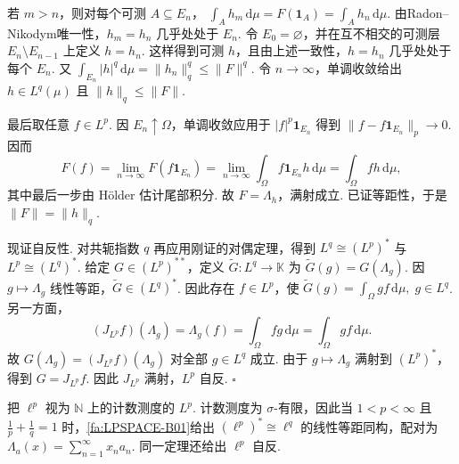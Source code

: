 \begin{FAProof}
若 \(\displaystyle m>n\)，则对每个可测 \(\displaystyle A\subseteq E_n\)， \(\displaystyle \int_Ah_m\,\mathrm{d}\mu =F(\mathbf1_A) =\int_Ah_n\,\mathrm{d}\mu\).
由Radon--Nikodym唯一性，\(\displaystyle h_m=h_n\) 几乎处处于 \(\displaystyle E_n\). 令 \(\displaystyle E_0=\varnothing\)，并在互不相交的可测层 \(\displaystyle E_n\setminus E_{n-1}\) 上定义 \(\displaystyle h=h_n\). 这样得到可测 \(\displaystyle h\)，且由上述一致性，\(\displaystyle h=h_n\) 几乎处处于每个 \(\displaystyle E_n\). 又 \(\displaystyle \int_{E_n}|h|^q\,\mathrm{d}\mu =\|h_n\|_q^q \leqslant\|F\|^q\).
令 \(\displaystyle n\to\infty\)，单调收敛给出 \(\displaystyle h\in L^q(\mu)\) 且 \(\displaystyle \|h\|_q\leqslant\|F\|\).

最后取任意 \(\displaystyle f\in L^p\). 因 \(\displaystyle E_n\uparrow\Omega\)，单调收敛应用于 \(\displaystyle |f|^p\mathbf1_{E_n}\) 得到 \(\displaystyle \|f-f\mathbf1_{E_n}\|_p\to0\). 因而
\[
F(f)
=\lim_{n\to\infty}F(f\mathbf1_{E_n})
=\lim_{n\to\infty}\int_\Omega f\mathbf1_{E_n}h\,\mathrm{d}\mu
=\int_\Omega fh\,\mathrm{d}\mu,
\]
其中最后一步由 Hölder 估计尾部积分. 故 \(\displaystyle F=\Lambda_h\)，满射成立. 已证等距性，于是 \(\displaystyle \|F\|=\|h\|_q\).

现证自反性. 对共轭指数 \(\displaystyle q\) 再应用刚证的对偶定理，得到 \(\displaystyle L^q\cong(L^p)^*\) 与 \(\displaystyle L^p\cong(L^q)^*\). 给定 \(\displaystyle G\in(L^p)^{**}\)，定义 \(\displaystyle \widetilde G:L^q\to\mathbb K\) 为 \(\displaystyle \widetilde G(g)=G(\Lambda_g)\). 因 \(\displaystyle g\mapsto\Lambda_g\) 线性等距，\(\displaystyle \widetilde G\in(L^q)^*\). 因此存在 \(\displaystyle f\in L^p\)，使 \(\displaystyle \widetilde G(g)=\int_\Omega gf\,\mathrm{d}\mu, \; g\in L^q\).
另一方面，
\[
(J_{L^p}f)(\Lambda_g)
=\Lambda_g(f)
=\int_\Omega fg\,\mathrm{d}\mu
=\int_\Omega gf\,\mathrm{d}\mu.
\]
故 \(\displaystyle G(\Lambda_g)=(J_{L^p}f)(\Lambda_g)\) 对全部 \(\displaystyle g\in L^q\) 成立. 由于 \(\displaystyle g\mapsto\Lambda_g\) 满射到 \(\displaystyle (L^p)^*\)，得到 \(\displaystyle G=J_{L^p}f\). 因此 \(\displaystyle J_{L^p}\) 满射，\(\displaystyle L^p\) 自反.
\hfill\(\square\)
\end{FAProof}

\begin{FAExample}\label{i07:ellp-dual-reflexive}
把 \(\displaystyle \ell^p\) 视为 \(\displaystyle \mathbb N\) 上的计数测度的 \(\displaystyle L^p\). 计数测度为 \(\displaystyle \sigma\)-有限，因此当 \(\displaystyle 1<p<\infty\) 且 \(\displaystyle \frac{1}{p}+\frac{1}{q}=1\) 时，\autoref{fa:LPSPACE-B01}给出 \(\displaystyle (\ell^p)^*\cong\ell^q\)
的线性等距同构，配对为 \(\displaystyle \Lambda_a(x)=\sum_{n=1}^{\infty}x_na_n\). 同一定理还给出 \(\displaystyle \ell^p\) 自反.
\end{FAExample}

